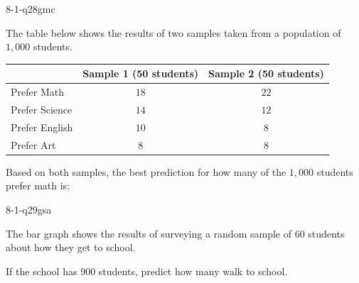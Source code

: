 \begin{practiceQuestion}{8-1-q28}{gmc}
\begin{questionText}
The table below shows the results of two samples taken from a population of $1{,}000$ students.

\begin{center}
\begin{tabular}{|l|c|c|}
\hline
 & \textbf{Sample 1 (50 students)} & \textbf{Sample 2 (50 students)} \\
\hline
Prefer Math & $18$ & $22$ \\
\hline
Prefer Science & $14$ & $12$ \\
\hline
Prefer English & $10$ & $8$ \\
\hline
Prefer Art & $8$ & $8$ \\
\hline
\end{tabular}
\end{center}

Based on both samples, the best prediction for how many of the $1{,}000$ students prefer math is:
\end{questionText}
\end{practiceQuestion}

\begin{practiceQuestion}{8-1-q29}{gsa}
\begin{questionText}
The bar graph shows the results of surveying a random sample of $60$ students about how they get to school.

\begin{center}
\end{center}

If the school has $900$ students, predict how many walk to school.
\end{questionText}
\end{practiceQuestion}

